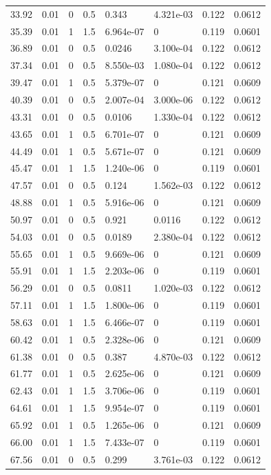 \documentclass[preview]{standalone}
\begin{document}
{{\begin{tabular}{L{1.2cm}C{1.2cm} C{0.3cm}C{0.5cm} C{1.4cm}C{1.4cm} C{1.4cm}C{1.4cm}}
  33.92  &  0.01  & 0     & 0.5 &  0.343  & 4.321e-03  & 0.122 &  0.0612   \\ 
  35.39  &  0.01  & 1     & 1.5 &  6.964e-07  & 0  & 0.119 &  0.0601   \\ 
  36.89  &  0.01  & 0     & 0.5 &  0.0246  & 3.100e-04  & 0.122 &  0.0612   \\ 
  37.34  &  0.01  & 0     & 0.5 &  8.550e-03  & 1.080e-04  & 0.122 &  0.0612   \\ 
  39.47  &  0.01  & 1     & 0.5 &  5.379e-07  & 0  & 0.121 &  0.0609   \\ 
  40.39  &  0.01  & 0     & 0.5 &  2.007e-04  & 3.000e-06  & 0.122 &  0.0612   \\ 
  43.31  &  0.01  & 0     & 0.5 &  0.0106  & 1.330e-04  & 0.122 &  0.0612   \\ 
  43.65  &  0.01  & 1     & 0.5 &  6.701e-07  & 0  & 0.121 &  0.0609   \\ 
  44.49  &  0.01  & 1     & 0.5 &  5.671e-07  & 0  & 0.121 &  0.0609   \\ 
  45.47  &  0.01  & 1     & 1.5 &  1.240e-06  & 0  & 0.119 &  0.0601   \\ 
  47.57  &  0.01  & 0     & 0.5 &  0.124  & 1.562e-03  & 0.122 &  0.0612   \\ 
  48.88  &  0.01  & 1     & 0.5 &  5.916e-06  & 0  & 0.121 &  0.0609   \\ 
  50.97  &  0.01  & 0     & 0.5 &  0.921  & 0.0116  & 0.122 &  0.0612   \\ 
  54.03  &  0.01  & 0     & 0.5 &  0.0189  & 2.380e-04  & 0.122 &  0.0612   \\ 
  55.65  &  0.01  & 1     & 0.5 &  9.669e-06  & 0  & 0.121 &  0.0609   \\ 
  55.91  &  0.01  & 1     & 1.5 &  2.203e-06  & 0  & 0.119 &  0.0601   \\ 
  56.29  &  0.01  & 0     & 0.5 &  0.0811  & 1.020e-03  & 0.122 &  0.0612   \\ 
  57.11  &  0.01  & 1     & 1.5 &  1.800e-06  & 0  & 0.119 &  0.0601   \\ 
  58.63  &  0.01  & 1     & 1.5 &  6.466e-07  & 0  & 0.119 &  0.0601   \\ 
  60.42  &  0.01  & 1     & 0.5 &  2.328e-06  & 0  & 0.121 &  0.0609   \\ 
  61.38  &  0.01  & 0     & 0.5 &  0.387  & 4.870e-03  & 0.122 &  0.0612   \\ 
  61.77  &  0.01  & 1     & 0.5 &  2.625e-06  & 0  & 0.121 &  0.0609   \\ 
  62.43  &  0.01  & 1     & 1.5 &  3.706e-06  & 0  & 0.119 &  0.0601   \\ 
  64.61  &  0.01  & 1     & 1.5 &  9.954e-07  & 0  & 0.119 &  0.0601   \\ 
  65.92  &  0.01  & 1     & 0.5 &  1.265e-06  & 0  & 0.121 &  0.0609   \\ 
  66.00  &  0.01  & 1     & 1.5 &  7.433e-07  & 0  & 0.119 &  0.0601   \\ 
  67.56  &  0.01  & 0     & 0.5 &  0.299  & 3.761e-03  & 0.122 &  0.0612   \\ 
\hline 
\end{tabular} 

}}
\end{document}
